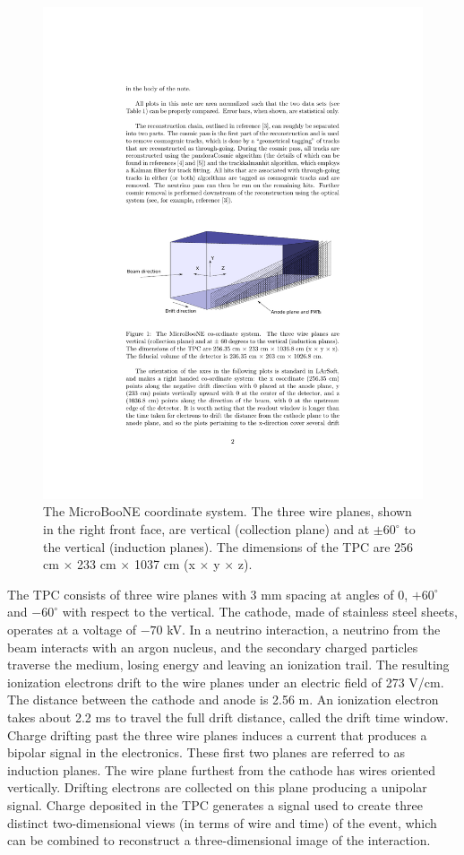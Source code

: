 \documentclass[a4paper,11pt]{article}
\begin{document}
\begin{figure}[htbp]
  \begin{center}
    \includegraphics[width=0.8\linewidth]{figures/coord.pdf}

    \caption{The MicroBooNE coordinate system. The three wire planes, shown in the right front face, are vertical (collection plane) and at  $\pm60^{\circ}$ to the vertical (induction planes). The dimensions of the TPC are 256 cm $\times$ 233 cm $\times$ 1037 cm (x $\times$ y $\times$ z).} \label{fig:coord}
  \end{center}
\end{figure}

The TPC consists of three wire planes with 3 mm spacing at angles of 0,  $+60^{\circ}$ and  $-60^{\circ}$ with respect to the vertical. The cathode, made of stainless steel sheets, operates at a voltage of $-70$ kV. In a neutrino interaction, a neutrino from the beam interacts with an argon nucleus, and the secondary charged particles traverse the medium, losing energy and leaving an ionization trail. The resulting ionization electrons drift to the wire planes under an electric field of 273 V/cm. The distance between the cathode and anode is 2.56 m. An ionization electron takes about 2.2 ms to travel the full drift distance, called the drift time window. Charge drifting past the three wire planes induces a current that produces a bipolar signal in the electronics. These first two planes are referred to as induction planes. The wire plane furthest from the cathode has wires oriented vertically. Drifting electrons are collected on this plane producing a unipolar signal. Charge deposited in the TPC generates a signal used to create three distinct two-dimensional views (in terms of wire and time) of the event, which can be combined to reconstruct a three-dimensional image of the interaction.
\end{document}
